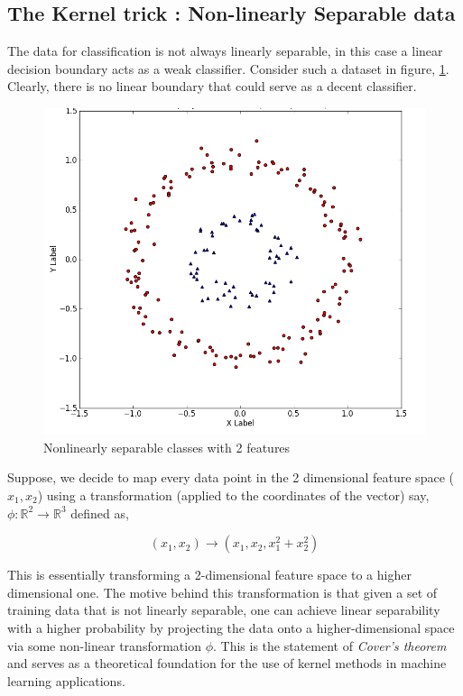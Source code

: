 \documentclass[final,3p,times,twocolumn]{elsarticle}
\begin{document}
\subsection{The Kernel trick : Non-linearly Separable data}
The data for classification is not always linearly separable, in this case a linear decision boundary acts as a weak classifier. Consider such a dataset in figure, \ref{nonlinear}. Clearly, there is no linear boundary that could serve as a decent classifier. 
\begin{figure}
\hspace{-9mm}
\includegraphics[scale=0.4]{Images/nonlinear_2d.png} 
\caption{Nonlinearly separable classes with 2 features}
\label{nonlinear}
\end{figure}

Suppose, we decide to map every data point in the 2 dimensional feature space ($x_{1}, x_{2}$) using a transformation (applied to the coordinates of the vector) say, $\phi : \mathbb{R}^2 \rightarrow \mathbb{R}^3$ defined as,

\begin{equation}
(x_{1},x_{2}) \rightarrow (x_{1},x_{2},x_{1}^2 + x_{2}^2)
\label{transformation}
\end{equation}

This is essentially transforming a 2-dimensional feature space to a higher dimensional one. The motive behind this transformation is that given a set of training data that is not linearly separable, one can achieve linear separability with a higher probability by projecting the data onto a higher-dimensional space via some non-linear transformation $\phi$. This is the statement of \textit{Cover's theorem} and serves as a theoretical foundation for the use of kernel methods in machine learning applications. \cite{Cover}
\end{document}
